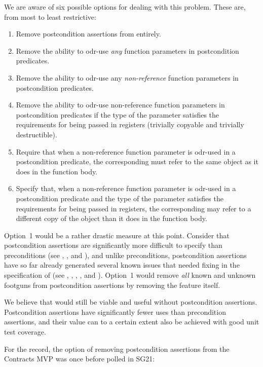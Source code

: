 We are aware of six possible options for dealing with this problem. These are, from most to least
restrictive:

\begin{enumerate}
\item Remove postcondition assertions from \cite{P2900R10} entirely.
\item Remove the ability to odr-use \emph{any} function parameters in postcondition predicates.
\item Remove the ability to odr-use any \emph{non-reference} function parameters in postcondition predicates.
\item Remove the ability to odr-use non-reference function parameters in postcondition predicates if the type of the parameter satisfies the requirements for being passed in registers (trivially copyable and trivially destructible).
\item Require that when a non-reference function parameter is odr-used in a postcondition predicate, the corresponding  must refer to the same object as it does in the function body.
\item Specify that, when a non-reference function parameter is odr-used in a postcondition predicate and the type of the parameter satisfies the requirements for being passed in registers, the corresponding  may refer to a different copy of the object than it does in the function body.
\end{enumerate}

Option~1 would be a rather drastic measure at this point. Consider that postcondition assertions are significantly more difficult to specify than preconditions (see \cite{P1323R2}, \cite{P3007R0}, and \cite{P3098R0}), and unlike preconditions, postcondition assertions have so far already generated several known issues that needed fixing in the specification of \cite{P2900R10} (see \cite{P3387R0}, \cite{P3460R0}, \cite{P3483R0}, \cite{D3484R1}, and \cite{D3489R0}). Option~1 would remove \emph{all} known and unknown footguns from postcondition assertions by removing the feature itself.

We believe that \cite{P2900R10} would still be viable and useful without postcondition assertions. Postcondition assertions have significantly fewer uses than precondition assertions, and their value can to a certain extent also be achieved with good unit test coverage. 

For the record, the option of removing postcondition assertions from the Contracts MVP was once before polled in SG21:

